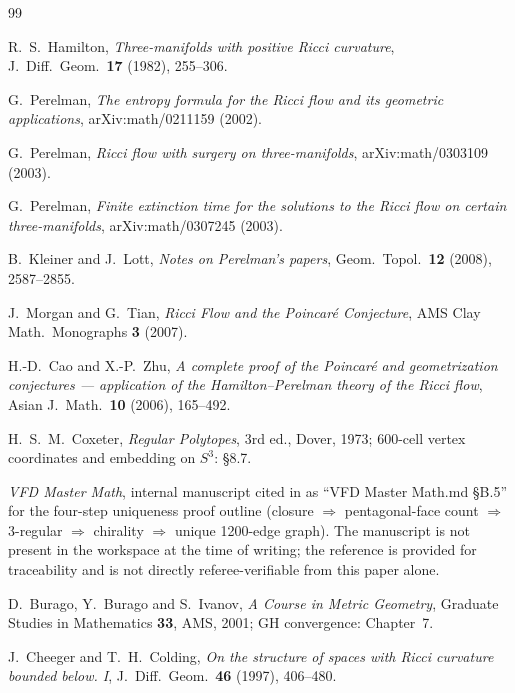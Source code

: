 \documentclass[11pt, a4paper]{amsart}
\theoremstyle{definition}
\begin{document}
\begin{thebibliography}{99}

R.~S.~Hamilton, \emph{Three-manifolds with positive Ricci curvature},
J.\ Diff.\ Geom.\ \textbf{17} (1982), 255--306.

G.~Perelman, \emph{The entropy formula for the Ricci flow and its
geometric applications}, arXiv:math/0211159 (2002).

G.~Perelman, \emph{Ricci flow with surgery on three-manifolds},
arXiv:math/0303109 (2003).

G.~Perelman, \emph{Finite extinction time for the solutions to the
Ricci flow on certain three-manifolds}, arXiv:math/0307245 (2003).

B.~Kleiner and J.~Lott, \emph{Notes on Perelman's papers}, Geom.\
Topol.\ \textbf{12} (2008), 2587--2855.

J.~Morgan and G.~Tian, \emph{Ricci Flow and the Poincar\'{e}
Conjecture}, AMS Clay Math.\ Monographs \textbf{3} (2007).

H.-D.~Cao and X.-P.~Zhu, \emph{A complete proof of the Poincar\'{e}
and geometrization conjectures --- application of the
Hamilton--Perelman theory of the Ricci flow}, Asian J.\ Math.\
\textbf{10} (2006), 165--492.

H.~S.~M.~Coxeter, \emph{Regular Polytopes}, 3rd ed., Dover, 1973;
600-cell vertex coordinates and embedding on $S^{3}$: \S 8.7.

\emph{VFD Master Math}, internal manuscript cited in
\cite[\S P5.2]{CascadePregeometry} as ``VFD Master Math.md \S B.5''
for the four-step uniqueness proof outline (closure $\Rightarrow$
pentagonal-face count $\Rightarrow$ 3-regular $\Rightarrow$
chirality $\Rightarrow$ unique 1200-edge graph). The manuscript
is not present in the workspace at the time of writing; the
reference is provided for traceability and is not directly
referee-verifiable from this paper alone.

D.~Burago, Y.~Burago and S.~Ivanov, \emph{A Course in Metric
Geometry}, Graduate Studies in Mathematics \textbf{33}, AMS, 2001;
GH convergence: Chapter~7.

J.~Cheeger and T.~H.~Colding, \emph{On the structure of spaces with
Ricci curvature bounded below. I}, J.\ Diff.\ Geom.\ \textbf{46}
(1997), 406--480.


\end{thebibliography}
\end{document}

